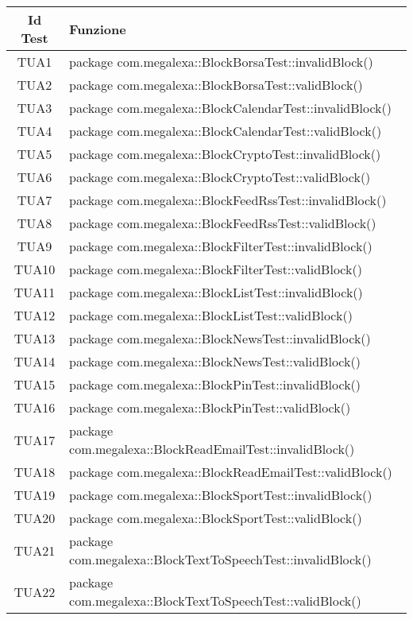 \normalsize
\begin{longtable}{|c|m{28em}|}
	\hline 
	\textbf{Id Test} & \textbf{Funzione}\\
	\hline
	\endhead
	TUA1 & package com.megalexa::BlockBorsaTest::invalidBlock() \\ \hline
	TUA2 & package com.megalexa::BlockBorsaTest::validBlock() \\ \hline
	TUA3 & package com.megalexa::BlockCalendarTest::invalidBlock()\\ \hline
	TUA4 & package com.megalexa::BlockCalendarTest::validBlock() \\ \hline
	TUA5 & package com.megalexa::BlockCryptoTest::invalidBlock() \\ \hline
	TUA6 & package com.megalexa::BlockCryptoTest::validBlock() \\ \hline
	TUA7 & package com.megalexa::BlockFeedRssTest::invalidBlock()\\ \hline
	TUA8 & package com.megalexa::BlockFeedRssTest::validBlock() \\ \hline
	TUA9 & package com.megalexa::BlockFilterTest::invalidBlock()\\ \hline
	TUA10 & package com.megalexa::BlockFilterTest::validBlock()\\ \hline
	TUA11 & package com.megalexa::BlockListTest::invalidBlock() \\ \hline
	TUA12 & package com.megalexa::BlockListTest::validBlock() \\ \hline
	TUA13 & package com.megalexa::BlockNewsTest::invalidBlock()\\ \hline
	TUA14 & package com.megalexa::BlockNewsTest::validBlock() \\ \hline
	TUA15 & package com.megalexa::BlockPinTest::invalidBlock()\\ \hline
	TUA16 & package com.megalexa::BlockPinTest::validBlock()\\ \hline
	TUA17 & package com.megalexa::BlockReadEmailTest::invalidBlock()\\ \hline
	TUA18 & package com.megalexa::BlockReadEmailTest::validBlock()\\ \hline	
	TUA19 & package com.megalexa::BlockSportTest::invalidBlock()\\ \hline
	TUA20 & package com.megalexa::BlockSportTest::validBlock()\\ \hline
	TUA21 & package com.megalexa::BlockTextToSpeechTest::invalidBlock()\\ \hline
	TUA22 & package com.megalexa::BlockTextToSpeechTest::validBlock()\\ \hline

\end{longtable}
